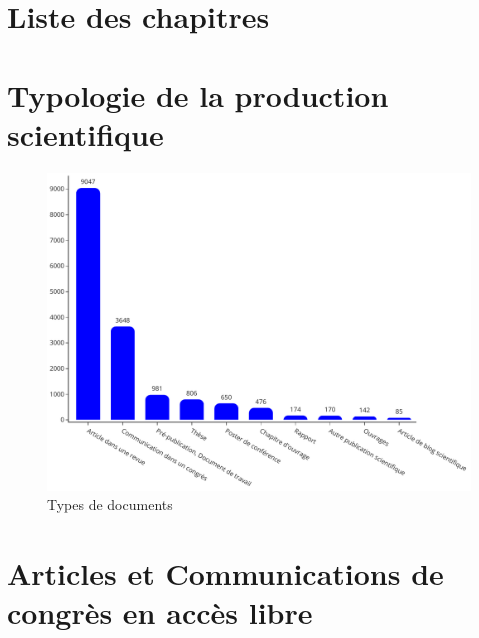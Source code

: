 \documentclass[french, 11pt]{dibiso/biso}
\begin{document}


\pagebreak

\section{Liste des chapitres}

{
  \footnotesize
  
}







\pagebreak

\section{Typologie de la production scientifique}

\begin{figure}[!h]
  \includegraphics[width=\textwidth]{figures/works_type.pdf}
  \centering
  \caption{Types de documents}
  \label{fig_doc_type}
\end{figure}







\pagebreak

\section{Articles et Communications de congrès en accès libre} %
\end{document}
